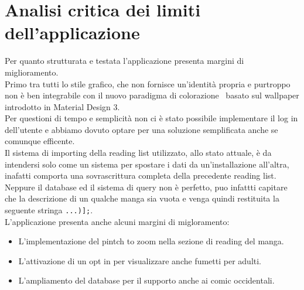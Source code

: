 \documentclass[../Assignment-3-LPSMT.tex]{subfiles}
\begin{document}
\chapter{Analisi critica dei limiti dell’applicazione}

Per quanto strutturata e testata l'applicazione presenta margini di miglioramento.\\
Primo tra tutti lo stile grafico, che non fornisce un'identità propria e purtroppo non è ben integrabile con il nuovo paradigma di colorazione~\cite{matDesColor} basato sul wallpaper introdotto in Material Design 3.\\
Per questioni di tempo e semplicità non ci è stato possibile implementare il log in dell'utente e abbiamo dovuto optare per una soluzione semplificata anche se comunque efficente.\\
Il sistema di importing della reading list utilizzato, allo stato attuale, è da intendersi solo come un sistema per spostare i dati da un'installazione all'altra, inafatti comporta una sovrascrittura completa della precedente reading list.\\
Neppure il database ed il sistema di query non è perfetto, puo infattti capitare che la descrizione di un qualche manga sia vuota e venga quindi restituita la seguente stringa \verb+...)];+.\\
L'applicazione presenta anche alcuni margini di migloramento:
\begin{itemize}
  \item L'implementazione del pintch to zoom nella sezione di reading del manga.
  \item L'attivazione di un opt in per visualizzare anche fumetti per adulti.
  \item L'ampliamento del database per il supporto anche ai comic occidentali.
\end{itemize}
\end{document}

